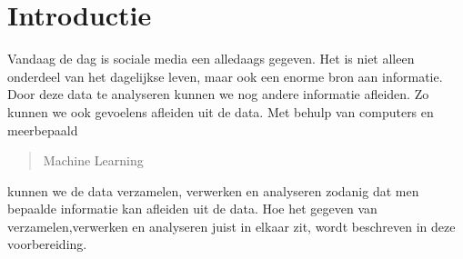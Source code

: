 \section{Introductie}\label{introductie}
Vandaag de dag is sociale media een alledaags gegeven. Het is niet alleen onderdeel van het dagelijkse leven, maar ook een enorme bron aan informatie.
Door deze data te analyseren kunnen we nog andere informatie afleiden. Zo kunnen we ook gevoelens afleiden uit de data. Met behulp van computers en meerbepaald \begin{quote}Machine Learning\end{quote} kunnen we de data verzamelen, verwerken en analyseren zodanig dat men bepaalde informatie kan afleiden uit de data.
Hoe het gegeven van verzamelen,verwerken en analyseren juist in elkaar zit, wordt beschreven in deze voorbereiding.



